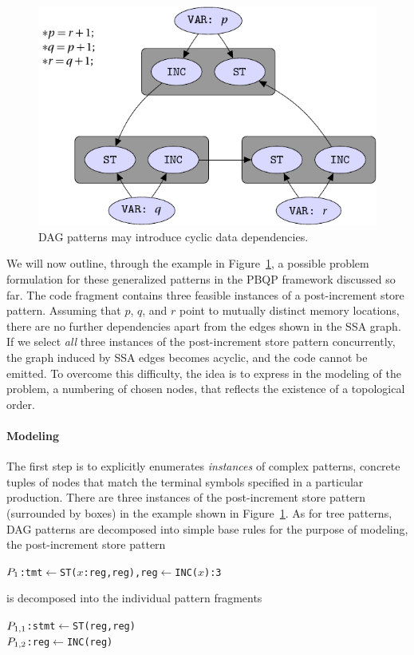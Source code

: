 \begin{figure}[t]
  \centering
  \includegraphics[scale=0.9]{pgf-fig008}
  \caption{DAG patterns may introduce cyclic data dependencies.}\label{fig:topology}
\end{figure}

We will now outline, through the example in
Figure~\ref{fig:topology}, a possible problem formulation for these
generalized patterns in the PBQP framework discussed so far. 
The code fragment contains three feasible instances of a post-increment
store pattern. Assuming that $p$, $q$, and $r$ point to mutually
distinct memory locations, there are no further dependencies apart
from the edges shown in the SSA graph. If we select \emph{all } three
instances of the post-increment store pattern concurrently, the graph induced by SSA edges becomes acyclic, and the code cannot be emitted. To overcome this difficulty, the idea is to express in the modeling of the problem, a numbering of chosen nodes, that reflects the existence of a topological order. 


\paragraph{Modeling}
The first step is to explicitly enumerates \emph{instances\/} of complex
patterns, \ie
concrete tuples of nodes that match the terminal symbols specified in
a particular production. There are three instances of the
post-increment store pattern (surrounded by boxes) in the example shown
in Figure~\ref{fig:topology}.
As for tree patterns, DAG patterns are decomposed into simple base
rules for the purpose of modeling, \eg the post-increment store
pattern
\begin{alltt}
  \(P\sb{1}\): tmt \(\gets\) ST(\(x\):reg, reg), reg \(\gets\) INC(\(x\)) : 3
\end{alltt}
is decomposed into the individual pattern fragments
\begin{alltt}
  \(P\sb{1,1}\): stmt \(\gets\) ST(reg, reg)
  \(P\sb{1,2}\): reg  \(\gets\) INC(reg)
\end{alltt}

